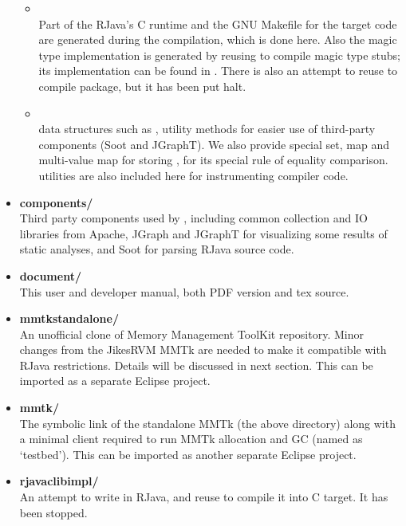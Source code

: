 \documentclass[12pt]{article}
\begin{document}
\begin{itemize}
\begin{itemize}
  \item {}\\
  Part of the RJava's C runtime and the GNU Makefile for the target code
  are generated during the compilation,
  which is done here. Also the magic type implementation is
  generated by reusing \rjc to compile magic type stubs; its
  implementation can be found in . 
  There is also an attempt to reuse \rjc to compile 
   package, but it has been put halt. 
  
  \item {}\\
  data structures such as , utility methods for easier use
  of third-party components (Soot and JGraphT). We also provide 
  special set, map and multi-value map for storing ,
  for its special rule of equality comparison.  utilities
  are also included here for instrumenting compiler code.
  \end{itemize}

\item
\textbf{components/\\}
Third party components used by \rjc, including common collection and IO
libraries from Apache, JGraph and JGraphT for visualizing some results of 
static analyses, and Soot for parsing RJava source code. 

\item
\textbf{document/\\}
This user and developer manual, both PDF version and tex source. 

\item
\textbf{mmtk\textunderscore standalone/\\}
An unofficial clone of Memory Management ToolKit repository. 
Minor changes from the JikesRVM MMTk are needed 
to make it compatible with RJava restrictions. Details will be discussed
in next section. This can be imported as a separate Eclipse project. 

\item
\textbf{mmtk/\\}
The symbolic link of the standalone MMTk (the above directory) along
with a minimal client required to run MMTk allocation and GC (named
as `testbed'). This can be imported as another separate Eclipse project. 

\item
\textbf{rjava\textunderscore clib\textunderscore impl/\\}
An attempt to write  in RJava, and reuse \rjc
to compile it into C target. It has been stopped. 


\end{itemize}
\end{document}
